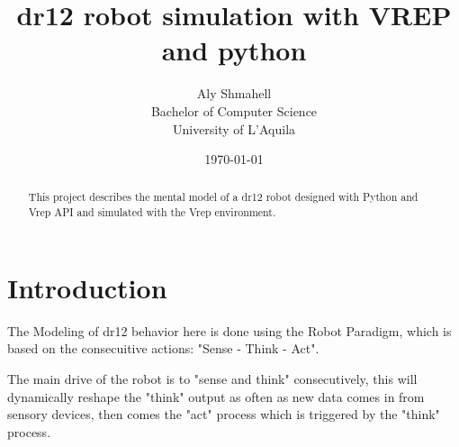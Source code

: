 \documentclass[10pt]{article}
\title{dr12 robot simulation with VREP and python}
\author
{
Aly Shmahell \\
Bachelor of Computer Science\\
University of L'Aquila\\
}
\date{\today}
\begin{document}
\maketitle

\begin{abstract}
This project describes the mental model of a dr12 robot designed with Python and Vrep API and simulated with the Vrep environment.
\end{abstract}

\section{Introduction}
The Modeling of dr12 behavior here is done using the Robot Paradigm, which is based on the consecuitive actions: "Sense - Think - Act".
\begin{center}
 
\end{center}
The main drive of the robot is to "sense and think" consecutively, this will dynamically reshape the "think" output as often as new data comes in from sensory devices, then comes the "act" process which is triggered by the "think" process.
  
\end{document}
